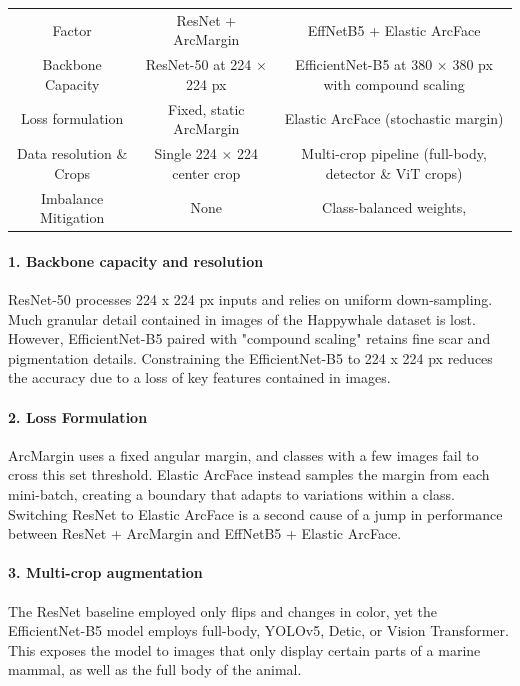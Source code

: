 \documentclass[twocolumn]{article}
\begin{document}
\begin{table}
    \centering
    \begin{tabular}{ccc}
         Factor&  ResNet + ArcMargin& EffNetB5 + Elastic ArcFace\\
         Backbone Capacity&  ResNet-50 at 224 × 224 px& EfficientNet-B5 at 380 × 380 px with compound scaling\\
         Loss formulation&  Fixed, static ArcMargin& Elastic ArcFace (stochastic margin)\\
         Data resolution \& Crops&  Single 224 × 224 center crop& Multi-crop pipeline (full-body, detector \& ViT crops)\\
         Imbalance Mitigation&  None& Class-balanced weights,\\
    \end{tabular}
    \label{tab:my_label}
\end{table}

\paragraph{1. Backbone capacity and resolution}

ResNet-50 processes 224 x 224 px inputs and relies on uniform down-sampling. Much granular detail contained in images of the Happywhale dataset is lost. However, EfficientNet-B5 paired with "compound scaling" retains fine scar and pigmentation details. Constraining the EfficientNet-B5 to 224 x 224 px reduces the accuracy due to a loss of key features contained in images. 

\paragraph{2. Loss Formulation}

ArcMargin uses a fixed angular margin, and classes with a few images fail to cross this set threshold. Elastic ArcFace instead samples the margin from each mini-batch, creating a boundary that adapts to variations within a class. Switching ResNet to Elastic ArcFace is a second cause of a jump in performance between ResNet + ArcMargin and EffNetB5 + Elastic ArcFace.

\paragraph{3. Multi-crop augmentation}

The ResNet baseline employed only flips and changes in color, yet the EfficientNet-B5 model employs full-body, YOLOv5, Detic, or Vision Transformer. This exposes the model to images that only display certain parts of a marine mammal, as well as the full body of the animal. 
\end{document}
